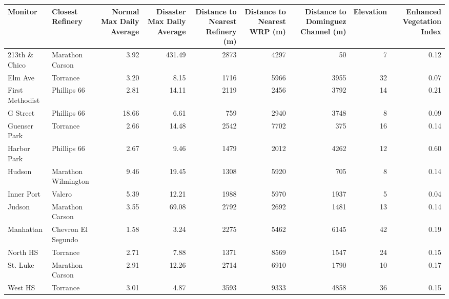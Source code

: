 
\begin{tabular}{l|l|r|r|r|r|r|r|r}
\hline
Monitor & Closest Refinery & Normal Max Daily Average & Disaster Max Daily Average & Distance to Nearest Refinery (m) & Distance to Nearest WRP (m) & Distance to Dominguez Channel (m) & Elevation & Enhanced Vegetation Index\\
\hline
213th \& Chico & Marathon Carson & 3.92 & 431.49 & 2873 & 4297 & 50 & 7 & 0.12\\
\hline
Elm Ave & Torrance & 3.20 & 8.15 & 1716 & 5966 & 3955 & 32 & 0.07\\
\hline
First Methodist & Phillips 66 & 2.81 & 14.11 & 2119 & 2456 & 3792 & 14 & 0.21\\
\hline
G Street & Phillips 66 & 18.66 & 6.61 & 759 & 2940 & 3748 & 8 & 0.09\\
\hline
Guenser Park & Torrance & 2.66 & 14.48 & 2542 & 7702 & 375 & 16 & 0.14\\
\hline
Harbor Park & Phillips 66 & 2.67 & 9.46 & 1479 & 2012 & 4262 & 12 & 0.60\\
\hline
Hudson & Marathon Wilmington & 9.46 & 19.45 & 1308 & 5920 & 705 & 8 & 0.14\\
\hline
Inner Port & Valero & 5.39 & 12.21 & 1988 & 5970 & 1937 & 5 & 0.04\\
\hline
Judson & Marathon Carson & 3.55 & 69.08 & 2792 & 2692 & 1481 & 13 & 0.14\\
\hline
Manhattan & Chevron El Segundo & 1.58 & 3.24 & 2275 & 5462 & 6145 & 42 & 0.19\\
\hline
North HS & Torrance & 2.71 & 7.88 & 1371 & 8569 & 1547 & 24 & 0.15\\
\hline
St. Luke & Marathon Carson & 2.91 & 12.26 & 2714 & 6910 & 1790 & 10 & 0.17\\
\hline
West HS & Torrance & 3.01 & 4.87 & 3593 & 9333 & 4858 & 36 & 0.15\\
\hline
\end{tabular}
